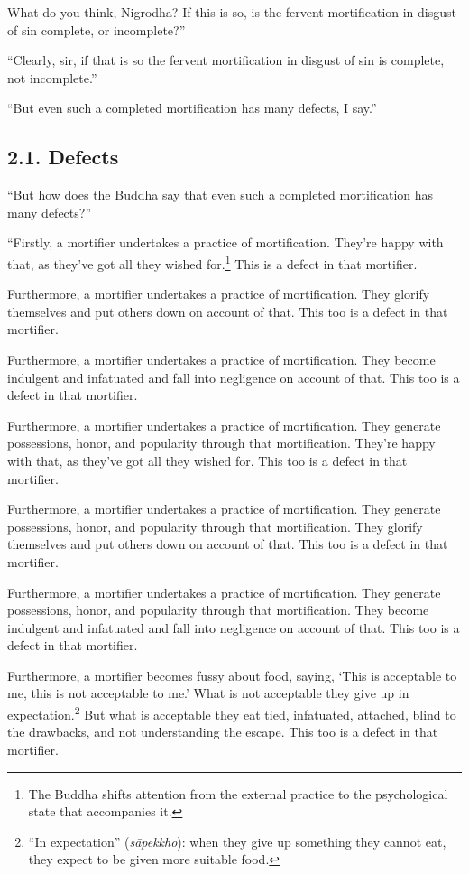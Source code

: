 \documentclass[12pt,openany]{book}%
\begin{document}
What do you think, Nigrodha? If this is so, is the fervent mortification in disgust of sin complete, or incomplete?” 

“Clearly, sir, if that is so the fervent mortification in disgust of sin is complete, not incomplete.” 

“But even such a completed mortification has many defects, I say.” 

\subsection*{2.1. Defects }

“But how does the Buddha say that even such a completed mortification has many defects?” 

“Firstly, a mortifier undertakes a practice of mortification. They’re happy with that, as they’ve got all they wished for.\footnote{The Buddha shifts attention from the external practice to the psychological state that accompanies it. } This is a defect in that mortifier. 

Furthermore, a mortifier undertakes a practice of mortification. They glorify themselves and put others down on account of that. This too is a defect in that mortifier. 

Furthermore, a mortifier undertakes a practice of mortification. They become indulgent and infatuated and fall into negligence on account of that. This too is a defect in that mortifier. 

Furthermore, a mortifier undertakes a practice of mortification. They generate possessions, honor, and popularity through that mortification. They’re happy with that, as they’ve got all they wished for. This too is a defect in that mortifier. 

Furthermore, a mortifier undertakes a practice of mortification. They generate possessions, honor, and popularity through that mortification. They glorify themselves and put others down on account of that. This too is a defect in that mortifier. 

Furthermore, a mortifier undertakes a practice of mortification. They generate possessions, honor, and popularity through that mortification. They become indulgent and infatuated and fall into negligence on account of that. This too is a defect in that mortifier. 

Furthermore, a mortifier becomes fussy about food, saying, ‘This is acceptable to me, this is not acceptable to me.’ What is not acceptable they give up in expectation.\footnote{“In expectation” (\textit{\textsanskrit{sāpekkho}}): when they give up something they cannot eat, they expect to be given more suitable food. } But what is acceptable they eat tied, infatuated, attached, blind to the drawbacks, and not understanding the escape. This too is a defect in that mortifier. 
\end{document}
